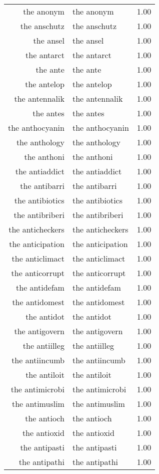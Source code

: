 \begin{table}[ht]
\begin{tabular}{rlr}
  the anonym & the anonym & 1.00 \\ 
  the anschutz & the anschutz & 1.00 \\ 
  the ansel & the ansel & 1.00 \\ 
  the antarct & the antarct & 1.00 \\ 
  the ante & the ante & 1.00 \\ 
  the antelop & the antelop & 1.00 \\ 
  the antennalik & the antennalik & 1.00 \\ 
  the antes & the antes & 1.00 \\ 
  the anthocyanin & the anthocyanin & 1.00 \\ 
  the anthology & the anthology & 1.00 \\ 
  the anthoni & the anthoni & 1.00 \\ 
  the antiaddict & the antiaddict & 1.00 \\ 
  the antibarri & the antibarri & 1.00 \\ 
  the antibiotics & the antibiotics & 1.00 \\ 
  the antibriberi & the antibriberi & 1.00 \\ 
  the anticheckers & the anticheckers & 1.00 \\ 
  the anticipation & the anticipation & 1.00 \\ 
  the anticlimact & the anticlimact & 1.00 \\ 
  the anticorrupt & the anticorrupt & 1.00 \\ 
  the antidefam & the antidefam & 1.00 \\ 
  the antidomest & the antidomest & 1.00 \\ 
  the antidot & the antidot & 1.00 \\ 
  the antigovern & the antigovern & 1.00 \\ 
  the antiilleg & the antiilleg & 1.00 \\ 
  the antiincumb & the antiincumb & 1.00 \\ 
  the antiloit & the antiloit & 1.00 \\ 
  the antimicrobi & the antimicrobi & 1.00 \\ 
  the antimuslim & the antimuslim & 1.00 \\ 
  the antioch & the antioch & 1.00 \\ 
  the antioxid & the antioxid & 1.00 \\ 
  the antipasti & the antipasti & 1.00 \\ 
  the antipathi & the antipathi & 1.00 \\ 

\end{tabular}
\end{table}
